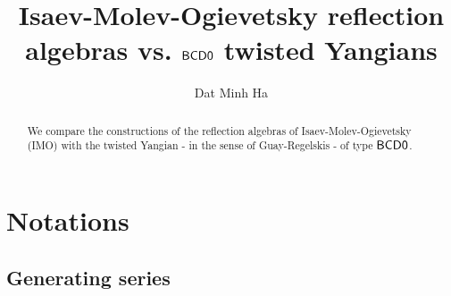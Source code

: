 

\setcounter{section}{-1}


\renewcommand{\simpleroots}{\mathbb{I}}
\newcommand{\romanzero}{\mathsf{0}}
\newcommand{\romanone}{\mathsf{I}}
\newcommand{\romantwo}{\mathsf{II}}
\newcommand{\romanthree}{\mathsf{III}}
\newcommand{\BCDzero}{\sfB\sfC\sfD\romanzero}
\newcommand{\XB}{\mathcal{XB}} %
\newcommand{\UXB}{\mathcal{UXB}} %
\newcommand{\UB}{\mathcal{UB}} %
\newcommand{\ZB}{\mathcal{ZB}} 



    \title{Isaev-Molev-Ogievetsky reflection algebras vs. $\BCDzero$ twisted Yangians}
    
    \author{Dat Minh Ha}
    \maketitle
    
    \begin{abstract}
        We compare the constructions of the reflection algebras of Isaev-Molev-Ogievetsky (IMO) with the twisted Yangian - in the sense of Guay-Regelskis - of type $\BCDzero$.
    \end{abstract}
    
    {
    \hypersetup{} 
    \tableofcontents %
    }

    \section{Notations}
        \subsection{Generating series}

